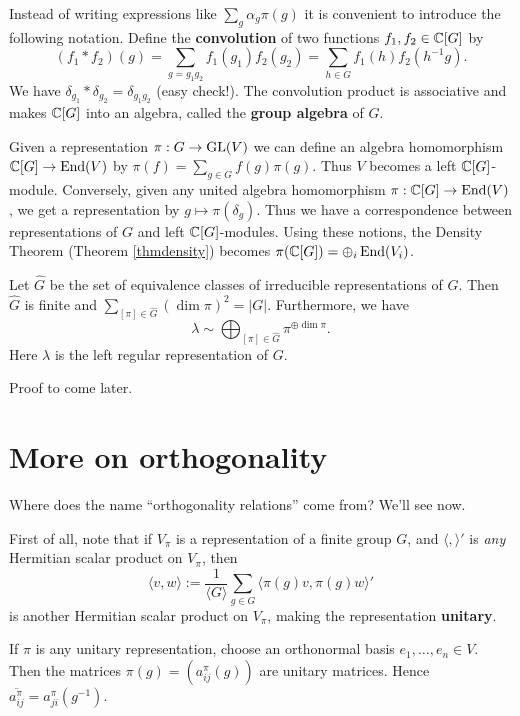 \documentclass[11pt, english]{article}
\begin{document}
Instead of writing expressions like $\sum_g \alpha_g \pi(g)$ it is convenient to introduce the following notation. Define the \textbf{convolution} of two functions $f_1,f_2 \in \mathbb{C}[G]$ by
$$
(f_1 \ast f_2)(g) = \sum_{g=g_1g_2} f_1(g_1)f_2(g_2) = \sum_{h \in G} f_1(h)f_2(h^{-1}g).
$$
We have $\delta_{g_1} \ast \delta_{g_2} = \delta_{g_1g_2}$ (easy check!). The convolution product is associative and makes $\mathbb{C}[G]$ into an algebra, called the \textbf{group algebra} of $G$. 

Given a representation $\pi:G \to \operatorname{GL}(V)$ we can define an algebra homomorphism $\mathbb{C}[G] \to \operatorname{End}(V)$ by $\pi(f) = \sum_{g \in G} f(g) \pi(g)$. Thus $V$ becomes a left $\mathbb{C}[G]$-module. Conversely, given any united algebra homomorphism $\pi:\mathbb{C}[G] \to \operatorname{End}(V)$, we get a representation by $g \mapsto \pi(\delta_g)$. Thus we have a correspondence between representations of $G$ and left $\mathbb{C}[G]$-modules. Using these notions, the Density Theorem (Theorem \ref{thmdensity}) becomes $\pi(\mathbb{C}[G]) = \oplus_i \operatorname{End}(V_i)$.

\begin{thm}
Let $\hat G$ be the set of equivalence classes of irreducible representations of $G$. Then $\hat G$ is finite and $\sum_{[\pi] \in \hat G} (\dim \pi)^2 = \lvert G \rvert$. Furthermore, we have
$$
\lambda \sim  \bigoplus_{[\pi] \in \hat G} \pi^{\oplus \dim \pi}.
$$
Here $\lambda$ is the left regular representation of $G$.
\end{thm}
Proof to come later.






\newpage
\section{More on orthogonality}

Where does the name ``orthogonality relations'' come from? We'll see now.

First of all, note that if $V_\pi$ is a representation of a finite group $G$, and $\langle,\rangle'$ is \emph{any} Hermitian scalar product on $V_\pi$, then 
$$
\langle v, w \rangle := \frac{1}{\langle G \rangle} \sum_{g \in G} \langle \pi(g) v, \pi(g) w \rangle'
$$
is another Hermitian scalar product on $V_\pi$, making the representation \textbf{unitary}.

If $\pi$ is any unitary representation, choose an orthonormal basis $e_1,\ldots,e_n \in V$. Then the matrices $\pi(g) = \left( a_{ij}^\pi(g) \right)$ are unitary matrices. Hence $\overline{a_{ij}^\pi} = a_{ji}^\pi(g^{-1})$.
\end{document}
